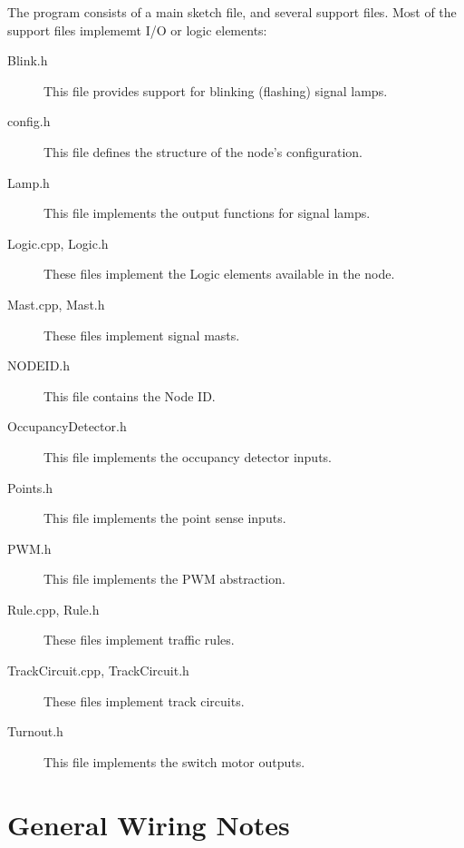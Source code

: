 The program consists of a main sketch file, and several support files.  Most 
of the support files implememt I/O or logic elements:

\begin{description}
\item[Blink.h] This file provides support for blinking (flashing) signal 
lamps.
\item[config.h] This file defines the structure of the node's configuration.
\item[Lamp.h] This file implements the output functions for signal lamps.
\item[Logic.cpp, Logic.h] These files implement the Logic elements available 
in the node.
\item[Mast.cpp, Mast.h] These files implement signal masts.
\item[NODEID.h] This file contains the Node ID.
\item[OccupancyDetector.h] This file implements the occupancy detector inputs.
\item[Points.h] This file implements the point sense inputs.
\item[PWM.h] This file implements the PWM abstraction.
\item[Rule.cpp, Rule.h] These files implement traffic rules.
\item[TrackCircuit.cpp, TrackCircuit.h] These files implement track circuits.
\item[Turnout.h] This file implements the switch motor outputs.
\end{description}

\section{General Wiring Notes}

